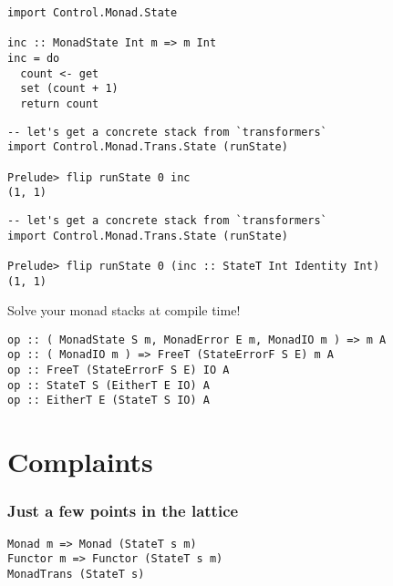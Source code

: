 \documentclass[pdf]{beamer}
\begin{document}
\begin{frame}[fragile]
\begin{lstlisting}
import Control.Monad.State

inc :: MonadState Int m => m Int
inc = do
  count <- get
  set (count + 1)
  return count
\end{lstlisting}
\end{frame}

\begin{frame}[fragile]
\begin{lstlisting}
-- let's get a concrete stack from `transformers`
import Control.Monad.Trans.State (runState)

Prelude> flip runState 0 inc 
(1, 1)
\end{lstlisting}
\end{frame}

\begin{frame}[fragile]
\begin{lstlisting}
-- let's get a concrete stack from `transformers`
import Control.Monad.Trans.State (runState)

Prelude> flip runState 0 (inc :: StateT Int Identity Int)
(1, 1)
\end{lstlisting}
\end{frame}

\begin{frame}
  Solve your monad stacks at compile time!
\end{frame}

\begin{frame}[fragile]
\begin{lstlisting}
op :: ( MonadState S m, MonadError E m, MonadIO m ) => m A
op :: ( MonadIO m ) => FreeT (StateErrorF S E) m A
op :: FreeT (StateErrorF S E) IO A
op :: StateT S (EitherT E IO) A
op :: EitherT E (StateT S IO) A
\end{lstlisting}
\end{frame}

\section{Complaints}

\begin{frame}[fragile]
  \frametitle{Just a few points in the lattice}
\begin{lstlisting}
Monad m => Monad (StateT s m)
Functor m => Functor (StateT s m)
MonadTrans (StateT s)
\end{lstlisting}
\end{frame}
\end{document}
